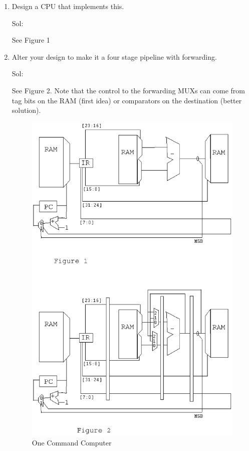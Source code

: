 \begin{enumerate}
    \item Design a CPU that implements this.

    {\color{ans}
    Sol:

    See Figure 1
    }

    \item Alter your design to make it a four stage pipeline with forwarding.

    {\color{ans}
    Sol:

    See Figure 2.  Note that the control to the forwarding MUXs can come from tag bits on the RAM (first idea) or comparators on the destination (better solution).
    }


\begin{figure}[h]
  \includegraphics[width=5.25in]{kohw_one_inst_computer.eps}
  \caption{One Command Computer}\label{f-1command}
\end{figure}



\end{enumerate}
